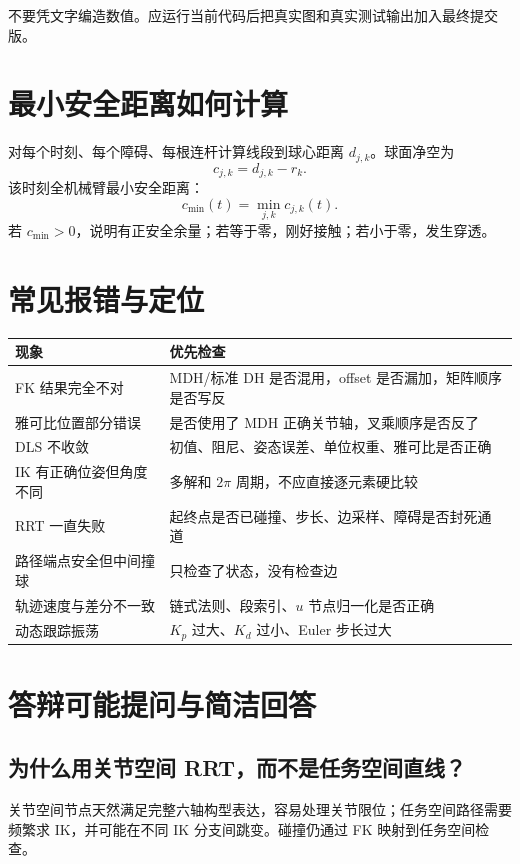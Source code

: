 不要凭文字编造数值。应运行当前代码后把真实图和真实测试输出加入最终提交版。

\section{最小安全距离如何计算}

对每个时刻、每个障碍、每根连杆计算线段到球心距离 $d_{j,k}$。球面净空为
\[
c_{j,k}=d_{j,k}-r_k.
\]
该时刻全机械臂最小安全距离：
\[
c_{\min}(t)=\min_{j,k}c_{j,k}(t).
\]
若 $c_{\min}>0$，说明有正安全余量；若等于零，刚好接触；若小于零，发生穿透。

\section{常见报错与定位}

\begin{longtable}{p{}p{}}
\toprule
现象 & 优先检查\\
\midrule
\endhead
FK 结果完全不对 & MDH/标准 DH 是否混用，offset 是否漏加，矩阵顺序是否写反\\
雅可比位置部分错误 & 是否使用了 MDH 正确关节轴，叉乘顺序是否反了\\
DLS 不收敛 & 初值、阻尼、姿态误差、单位权重、雅可比是否正确\\
IK 有正确位姿但角度不同 & 多解和 $2\pi$ 周期，不应直接逐元素硬比较\\
RRT 一直失败 & 起终点是否已碰撞、步长、边采样、障碍是否封死通道\\
路径端点安全但中间撞球 & 只检查了状态，没有检查边\\
轨迹速度与差分不一致 & 链式法则、段索引、$u$ 节点归一化是否正确\\
动态跟踪振荡 & $K_p$ 过大、$K_d$ 过小、Euler 步长过大\\
\bottomrule
\end{longtable}

\section{答辩可能提问与简洁回答}

\subsection*{为什么用关节空间 RRT，而不是任务空间直线？}
关节空间节点天然满足完整六轴构型表达，容易处理关节限位；任务空间路径需要
频繁求 IK，并可能在不同 IK 分支间跳变。碰撞仍通过 FK 映射到任务空间检查。

